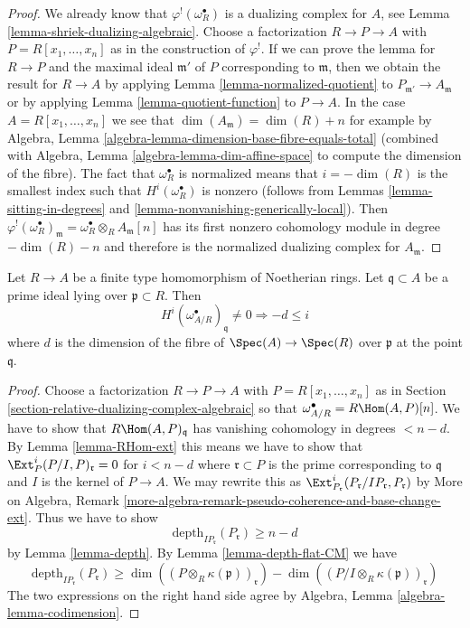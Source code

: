 \begin{proof}
We already know that $\varphi^!(\omega_R^\bullet)$ is a dualizing
complex for $A$, see Lemma \ref{lemma-shriek-dualizing-algebraic}.
Choose a factorization $R \to P \to A$ with $P = R[x_1, \ldots, x_n]$
as in the construction of $\varphi^!$. If we can prove the
lemma for $R \to P$ and the maximal ideal $\mathfrak m'$ of $P$ corresponding to
$\mathfrak m$, then we obtain the result for $R \to A$ by
applying Lemma \ref{lemma-normalized-quotient} to
$P_{\mathfrak m'} \to A_\mathfrak m$ or by applying
Lemma \ref{lemma-quotient-function} to $P \to A$.
In the case $A = R[x_1, \ldots, x_n]$ we see that
$\dim(A_\mathfrak m) = \dim(R) + n$ for example by
Algebra, Lemma \ref{algebra-lemma-dimension-base-fibre-equals-total}
(combined with Algebra, Lemma \ref{algebra-lemma-dim-affine-space}
to compute the dimension of the fibre).
The fact that $\omega_R^\bullet$ is normalized means
that $i = -\dim(R)$ is the smallest index such that
$H^i(\omega_R^\bullet)$ is nonzero (follows from
Lemmas \ref{lemma-sitting-in-degrees} and
\ref{lemma-nonvanishing-generically-local}).
Then $\varphi^!(\omega_R^\bullet)_\mathfrak m =
\omega_R^\bullet \otimes_R A_\mathfrak m[n]$
has its first nonzero cohomology module in degree $-\dim(R) - n$
and therefore is the normalized dualizing complex for $A_\mathfrak m$.
\end{proof}

\begin{lemma}
\label{lemma-relative-dualizing-trivial-vanishing}
Let $R \to A$ be a finite type homomorphism of Noetherian rings.
Let $\mathfrak q \subset A$ be a prime ideal lying over
$\mathfrak p \subset R$. Then
$$
H^i(\omega_{A/R}^\bullet)_\mathfrak q \not = 0
\Rightarrow - d \leq i
$$
where $d$ is the dimension of the fibre of $\Spec(A) \to \Spec(R)$
over $\mathfrak p$ at the point $\mathfrak q$.
\end{lemma}

\begin{proof}
Choose a factorization $R \to P \to A$ with $P = R[x_1, \ldots, x_n]$
as in Section \ref{section-relative-dualizing-complex-algebraic}
so that $\omega_{A/R}^\bullet = R\Hom(A, P)[n]$.
We have to show that $R\Hom(A, P)_\mathfrak q$
has vanishing cohomology in degrees $< n - d$.
By Lemma \ref{lemma-RHom-ext} this means we have to
show that $\Ext_P^i(P/I, P)_{\mathfrak r} = 0$ for $i < n - d$
where $\mathfrak r \subset P$ is the prime corresponding to $\mathfrak q$
and $I$ is the kernel of $P \to A$.
We may rewrite this as
$\Ext_{P_\mathfrak r}^i(P_\mathfrak r/IP_\mathfrak r, P_\mathfrak r)$
by More on Algebra, Remark
\ref{more-algebra-remark-pseudo-coherence-and-base-change-ext}.
Thus we have to show
$$
\text{depth}_{IP_\mathfrak r}(P_\mathfrak r) \geq n - d
$$
by Lemma \ref{lemma-depth}.
By Lemma \ref{lemma-depth-flat-CM} we have
$$
\text{depth}_{IP_\mathfrak r}(P_\mathfrak r) \geq
\dim((P \otimes_R \kappa(\mathfrak p))_\mathfrak r) -
\dim((P/I \otimes_R \kappa(\mathfrak p))_\mathfrak r)
$$
The two expressions on the right hand side agree by
Algebra, Lemma \ref{algebra-lemma-codimension}.
\end{proof}

